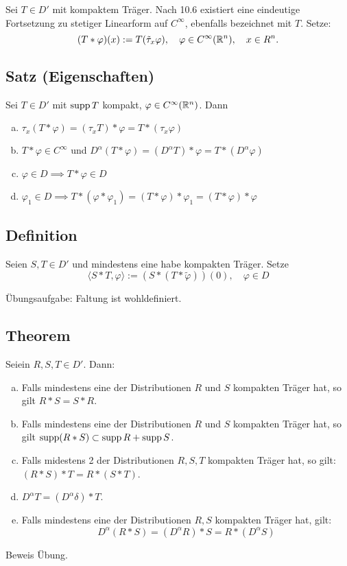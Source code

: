 Sei $T \in D'$ mit kompaktem Träger.
Nach 10.6 existiert eine eindeutige Fortsetzung zu stetiger Linearform auf $C^\infty$, ebenfalls bezeichnet mit $T$.
Setze:
$$
(T \ast \varphi)(x) := T(\tilde\tau_x \varphi), \quad \varphi \in C^\infty(\mathbb{R}^n), \quad x \in R^n.
$$

\subsection{Satz (Eigenschaften)}

Sei $T \in D'$ mit $\operatorname{supp} T$ kompakt, $\varphi \in C^\infty(\mathbb{R}^n)$.
Dann
\begin{enumerate}[a)]
  \item $\tau_x(T\ast \varphi) = (\tau_x T) \ast \varphi = T \ast (\tau_x \varphi)$
  \item $T \ast \varphi \in C^\infty$ und $D^\alpha (T\ast \varphi) = (D^\alpha T) \ast \varphi = T \ast (D^\alpha \varphi)$
  \item $\varphi \in D \implies T\ast \varphi \in D$
  \item $\varphi_1 \in D \implies T \ast (\varphi \ast \varphi_1) = (T \ast \varphi ) \ast \varphi_1 = (T \ast \varphi) \ast \varphi$
\end{enumerate}

\subsection{Definition}

Seien $S,T \in D'$ und mindestens eine habe kompakten Träger.
Setze
$$
\langle S \ast T, \varphi \rangle := (S \ast (T \ast \tilde \varphi))(0), \quad \varphi \in D
$$

Übungsaufgabe: Faltung ist wohldefiniert.

\subsection{Theorem}

Seiein $R,S,T \in D'$.
Dann:

\begin{enumerate}[a)]
  \item Falls mindestens eine der Distributionen $R$ und $S$ kompakten Träger hat, so gilt $R \ast S = S \ast R$.
  \item Falls mindestens eine der Distributionen $R$ und $S$ kompakten Träger hat, so gilt $\operatorname{supp}(R \ast S) \subset \operatorname{supp} R + \operatorname{supp} S$.
  \item Falls midestens 2 der Distributionen $R,S,T$ kompakten Träger hat, so gilt: $(R \ast S) \ast T = R \ast (S \ast T)$.
  \item $D^\alpha T = (D^\alpha \delta) \ast T$.
  \item Falls mindestens eine der Distributionen $R,S$ kompakten Träger hat, gilt:
    $$
    D^\alpha(R\ast S) = (D^\alpha R)  \ast S = R \ast (D^\alpha S)
    $$
\end{enumerate}

Beweis Übung.
